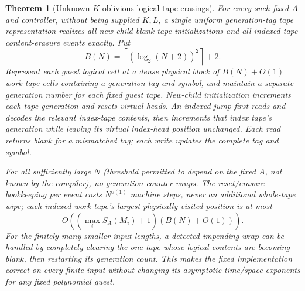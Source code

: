 \documentclass[11pt]{article}
\newtheorem{theorem}{Theorem}
\begin{document}
\begin{theorem}[Unknown-$K$-oblivious logical tape erasings]
For every such fixed $A$ and controller, without being supplied $K,L$, a single \emph{uniform} generation-tag tape representation realizes all new-child blank-tape initializations and all indexed-tape content-erasure events exactly. Put
\[
B(N)=\left\lceil(\log_2(N+2))^2\right\rceil+2.
\]
Represent each guest logical cell at a dense physical block of $B(N)+O(1)$ work-tape cells containing a generation tag and symbol, and maintain a separate generation number for each fixed guest tape. New-child initialization increments each tape generation and resets virtual heads. An indexed jump first reads and decodes the relevant index-tape contents, then increments \emph{that index tape's} generation while leaving its virtual index-head position unchanged. Each read returns blank for a mismatched tag; each write updates the complete tag and symbol.

For all sufficiently large $N$ (threshold permitted to depend on the fixed $A$, not known by the compiler), no generation counter wraps. The reset/erasure bookkeeping per event costs $N^{o(1)}$ machine steps, never an additional whole-tape wipe; each indexed work-tape's largest physically visited position is at most
\[
O((\max_i S_A(M_i)+1)(B(N)+O(1))).
\]
For the finitely many smaller input lengths, a detected impending wrap can be handled by completely clearing \emph{the one tape whose logical contents are becoming blank}, then restarting its generation count. This makes the fixed implementation correct on every finite input without changing its asymptotic time/space exponents for any fixed polynomial guest.
\end{theorem}
\end{document}
